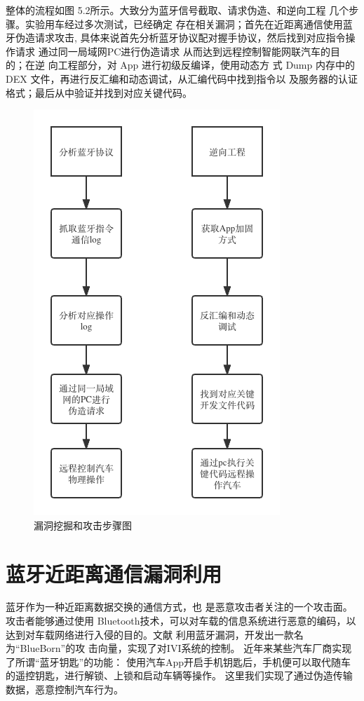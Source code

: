 整体的流程如图 5.2所示。大致分为蓝牙信号截取、请求伪造、和逆向工程
几个步骤。实验用车经过多次测试，已经确定
存在相关漏洞；首先在近距离通信使用蓝牙伪造请求攻击, 具体来说首先分析蓝牙协议配对握手协议，然后找到对应指令操作请求
通过同一局域网PC进行伪造请求 从而达到远程控制智能网联汽车的目的；在逆
向工程部分，对 App 进行初级反编译，使用动态方
式 Dump 内存中的 DEX 文件，再进行反汇编和动态调试，从汇编代码中找到指令以
及服务器的认证格式；最后从中验证并找到对应关键代码。
\begin{figure}
  \centering
  \includegraphics[scale=0.5]{resources/img/i23.png}
  \caption{漏洞挖掘和攻击步骤图}
\end{figure}
\newline
\section {蓝牙近距离通信漏洞利用}
蓝牙作为一种近距离数据交换的通信方式，也
是恶意攻击者关注的一个攻击面。攻击者能够通过使用 Bluetooth技术，可以对车载的信息系统进行恶意的编码，以达到对车载网络进行入侵的目的。文献\cite{antian}
利用蓝牙漏洞，开发出一款名为“BlueBorn”的攻
击向量，实现了对IVI系统的控制。
近年来某些汽车厂商实现了所谓“蓝牙钥匙”的功能：
使用汽车App开启手机钥匙后，手机便可以取代随车的遥控钥匙，进行解锁、上锁和启动车辆等操作。
这里我们实现了通过伪造传输数据，恶意控制汽车行为。
